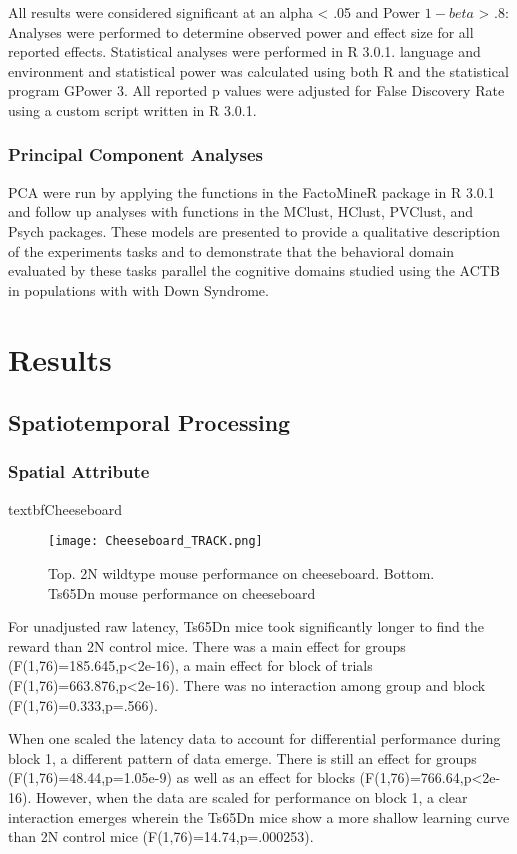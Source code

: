 \documentclass{article}
\begin{document}
All results were considered significant at an alpha < .05 and Power \(1-beta\) > .8: Analyses were performed to determine observed power and effect size for all reported effects. Statistical analyses were performed in R 3.0.1. language and environment and statistical power was calculated using both R and the statistical program GPower 3. All reported p values were adjusted for False Discovery Rate using a custom script written in R 3.0.1.

\subsubsection{Principal Component Analyses}

PCA were run by applying the functions in the FactoMineR package in R 3.0.1 and follow up analyses with functions in the MClust, HClust, PVClust, and Psych packages. These models are presented to provide a qualitative description of the experiments tasks and to demonstrate that the behavioral domain evaluated by these tasks parallel the cognitive domains studied using the ACTB in populations with with Down Syndrome.


\section{Results}
\subsection{Spatiotemporal Processing}
\subsubsection{Spatial Attribute}

textbf{Cheeseboard}

\begin{figure}[h!]
\centering
\texttt{[image: Cheeseboard\_TRACK.png]}
\caption{Top. 2N wildtype mouse performance on cheeseboard. Bottom. Ts65Dn mouse performance on cheeseboard}
\label{fig:Cheeseboard Track}
\end{figure}

For unadjusted raw latency, Ts65Dn mice took significantly longer to find the reward than 2N control mice. There was a main effect for groups (F(1,76)=185.645,p<2e-16), a main effect for block of trials (F(1,76)=663.876,p<2e-16). There was no interaction among group and block (F(1,76)=0.333,p=.566).

When one scaled the latency data to account for differential performance during block 1, a different pattern of data emerge. There is still an effect for groups (F(1,76)=48.44,p=1.05e-9) as well as an effect for blocks (F(1,76)=766.64,p<2e-16). However, when the data are scaled for performance on block 1, a clear interaction emerges wherein the Ts65Dn mice show a more shallow learning curve than 2N control mice (F(1,76)=14.74,p=.000253).
\end{document}

